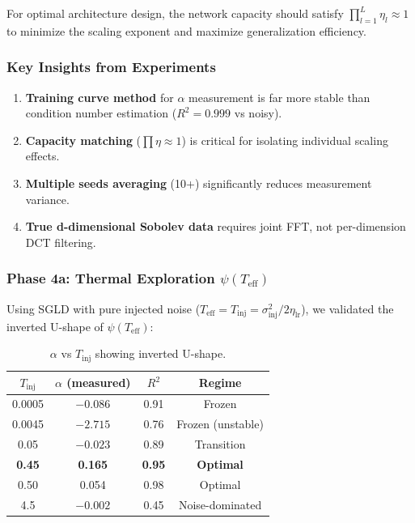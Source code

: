 \documentclass[11pt, a4paper]{article}
\theoremstyle{definition}
\begin{document}
\begin{coro}
For optimal architecture design, the network capacity should satisfy $\prod_{l=1}^L \eta_l \approx 1$ to minimize the scaling exponent and maximize generalization efficiency.
\end{coro}

\subsubsection{Key Insights from Experiments}

\begin{enumerate}
    \item \textbf{Training curve method} for $\alpha$ measurement is far more stable than condition number estimation ($R^2 = 0.999$ vs noisy).
    \item \textbf{Capacity matching} ($\prod\eta \approx 1$) is critical for isolating individual scaling effects.
    \item \textbf{Multiple seeds averaging} (10+) significantly reduces measurement variance.
    \item \textbf{True d-dimensional Sobolev data} requires joint FFT, not per-dimension DCT filtering.
\end{enumerate}

\subsubsection{Phase 4a: Thermal Exploration $\psi(T_{\text{eff}})$}

Using SGLD with pure injected noise ($T_{\text{eff}} = T_{\text{inj}} = \sigma_{\text{inj}}^2 / 2\eta_{\text{lr}}$), we validated the inverted U-shape of $\psi(T_{\text{eff}})$:

\begin{table}[htbp]
\centering
\caption{$\alpha$ vs $T_{\text{inj}}$ showing inverted U-shape.}
\label{tab:temp_scaling}
\begin{tabular}{@{}cccc@{}}
\toprule
$T_{\text{inj}}$ & $\alpha$ (measured) & $R^2$ & \textbf{Regime} \\
\midrule
0.0005 & $-0.086$ & 0.91 & Frozen \\
0.0045 & $-2.715$ & 0.76 & Frozen (unstable) \\
0.05 & $-0.023$ & 0.89 & Transition \\
\textbf{0.45} & \textbf{0.165} & \textbf{0.95} & \textbf{Optimal} \\
0.50 & 0.054 & 0.98 & Optimal \\
4.5 & $-0.002$ & 0.45 & Noise-dominated \\
\bottomrule
\end{tabular}
\end{table}
\end{document}
